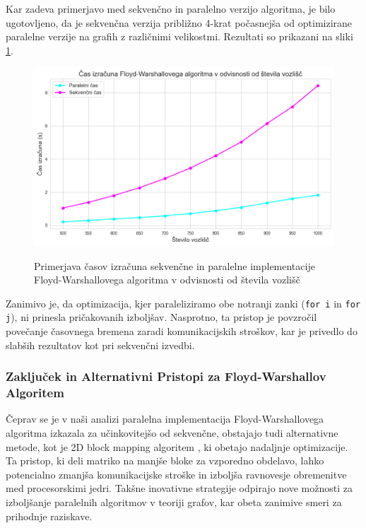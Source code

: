\documentclass[mat1, tisk]{fmfdelo}
\begin{document}
Kar zadeva primerjavo med sekvenčno in paralelno verzijo algoritma, je bilo ugotovljeno, da je sekvenčna verzija približno 4-krat počasnejša
od optimizirane paralelne verzije na grafih z različnimi velikostmi. Rezultati so prikazani na sliki \ref{fig:floyd_v_odvisnosti_od_velikosti_grafa}.

\begin{figure}[h!]
  \centering
  \caption{Primerjava časov izračuna sekvenčne in paralelne implementacije Floyd-Warshallovega algoritma v odvisnosti od števila vozlišč}
  \includegraphics[width=15cm]{slike/floyd_v_odvisnosti_od_velikosti_grafa.jpg}
  \label{fig:floyd_v_odvisnosti_od_velikosti_grafa}
\end{figure}

Zanimivo je, da optimizacija, kjer paraleliziramo obe notranji zanki (\texttt{for i} in \texttt{for j}), ni prinesla pričakovanih izboljšav.
Nasprotno, ta pristop je povzročil povečanje časovnega bremena zaradi komunikacijskih stroškov, kar je privedlo do slabših rezultatov
kot pri sekvenčni izvedbi.

\subsubsection{Zaključek in Alternativni Pristopi za Floyd-Warshallov Algoritem}

Čeprav se je v naši analizi paralelna implementacija Floyd-Warshallovega algoritma izkazala za učinkovitejšo od sekvenčne, obstajajo tudi
alternativne metode, kot je 2D block mapping algoritem \cite{parallel_floyd_warshall}, ki obetajo nadaljnje optimizacije. Ta pristop, ki deli matriko na manjše bloke za
vzporedno obdelavo, lahko potencialno zmanjša komunikacijske stroške in izboljša ravnovesje obremenitve med procesorskimi jedri. Takšne
inovativne strategije odpirajo nove možnosti za izboljšanje paralelnih algoritmov v teoriji grafov, kar obeta zanimive smeri za prihodnje raziskave.
\end{document}
